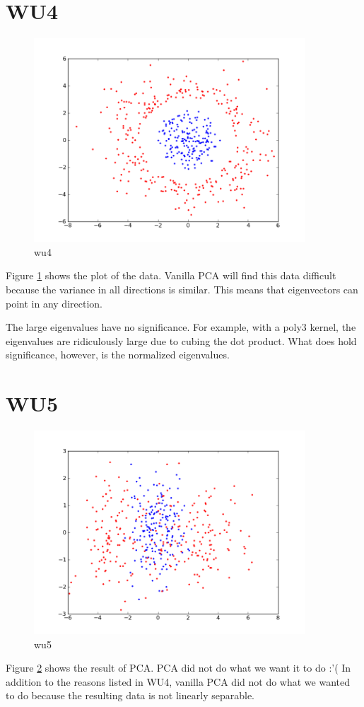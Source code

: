 \section*{WU4}
\begin{figure}[here]
	\center
	\caption{wu4}
	\label{fig:wu4}
	\includegraphics[width=4.0in]{img/wu4.png}
\end{figure}
Figure \ref{fig:wu4} shows the plot of the data. 
Vanilla PCA will find this data difficult because the variance in all directions is similar. This means that eigenvectors can point in any direction.

The large eigenvalues have no significance. For example, with a poly3 kernel, the eigenvalues are ridiculously 
large due to cubing the dot product. What does hold significance, however, is the normalized eigenvalues. 

\section*{WU5}
\begin{figure}[here]
\label{fig:wu5}
	\center
	\caption{wu5}
	\includegraphics[width=4.0in]{img/wu5.png}
\end{figure}
Figure \ref{fig:wu5} shows the result of PCA. 
PCA did not do what we want it to do :'(
In addition to the reasons listed in WU4, vanilla PCA 
did not do what we wanted to do because the resulting data 
is not linearly separable.

